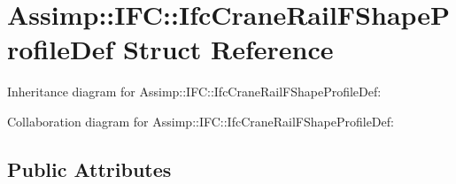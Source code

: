 \hypertarget{struct_assimp_1_1_i_f_c_1_1_ifc_crane_rail_f_shape_profile_def}{\section{Assimp\+:\+:I\+F\+C\+:\+:Ifc\+Crane\+Rail\+F\+Shape\+Profile\+Def Struct Reference}
\label{struct_assimp_1_1_i_f_c_1_1_ifc_crane_rail_f_shape_profile_def}
}


Inheritance diagram for Assimp\+:\+:I\+F\+C\+:\+:Ifc\+Crane\+Rail\+F\+Shape\+Profile\+Def\+:


Collaboration diagram for Assimp\+:\+:I\+F\+C\+:\+:Ifc\+Crane\+Rail\+F\+Shape\+Profile\+Def\+:
\subsection*{Public Attributes}
